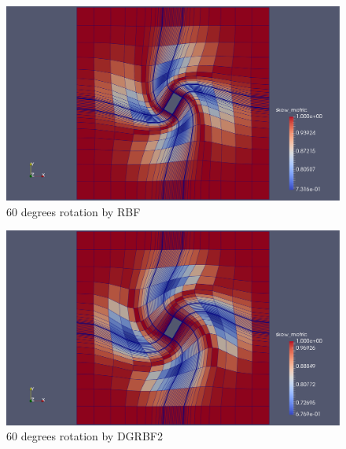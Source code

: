 \documentclass[t,12pt]{beamer}
\begin{document}
\begin{frame}
	 \begin{figure}
	 	\centering
	 	\includegraphics[scale=0.2]{qin-60-rbf-quality.pdf}
	 	\caption{60 degrees rotation by RBF}
	 	\label{fig:qin-60-rbf}
	 \end{figure}
\end{frame}
\begin{frame}
	 \begin{figure}
	 	\centering
	 	\includegraphics[scale=0.2]{qin-60-dgrbf2-quality.pdf}
	 	\caption{60 degrees rotation by DGRBF2}
	 	\label{fig:qin-60-dgrbf2}
	 \end{figure}
\end{frame}
\end{document}
